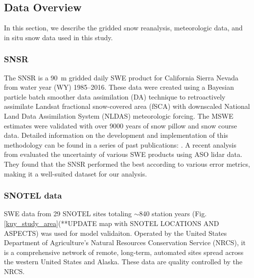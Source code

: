 \hypertarget{ch2-do-1}{\subsection{Data Overview}\label{ch2-do-1}}

In this section, we describe the gridded snow reanalysis, meteorologic data, and in situ snow data used in this study.

\hypertarget{ch2-do-2}{\subsubsection{SNSR}\label{ch2-do-2}}


The SNSR \citep{margulisLandsatEraSierraNevada2016} is a 90~m gridded daily SWE product for California Sierra Nevada from water year (WY) 1985--2016. These data were created using a Bayesian particle batch smoother data assimilation (DA) technique to retroactively assimilate Landsat fractional snow-covered area (fSCA) with downscaled National Land Data Assimilation System (NLDAS) meteorologic forcing. The MSWE estimates were validated with over 9000 years of snow pillow and snow course data. Detailed information on the development and implementation of this methodology can be found in a series of past publications: \cite{durandBayesianApproachSnow2008, girottoExaminingSpatialTemporal2014, girottoProbabilisticSWEReanalysis2014, margulisParticleBatchSmoother2015}. A recent analysis from \citep{yangIntercomparisonSnowWater2023} evaluated the uncertainty of various SWE products using ASO lidar data. They found that the SNSR performed the best according to various error metrics, making it a well-suited dataset for our analysis.

\hypertarget{ch2-do-2}{\subsubsection{SNOTEL data}\label{ch2-do-2}}


SWE data from 29 SNOTEL sites totaling $\sim$840 station years (Fig. \ref{kuy_study_area}(**UPDATE map with SNOTEL LOCATIONS AND ASPECTS) was used for model validaiton. Operated by the United States Department of Agriculture's Natural Resources Conservation Service (NRCS), it is a comprehensive network of remote, long-term, automated sites spread across the western United States and Alaska. These data are quality controlled by the NRCS.

